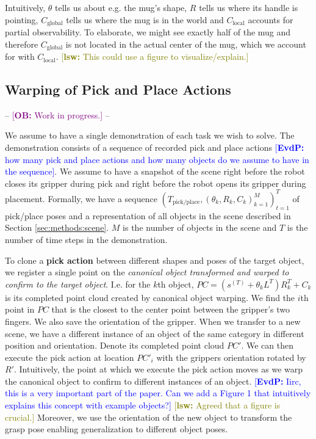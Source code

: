 \documentclass{article}
\newcommand{\ob}[1]{\textcolor{purple}{[\textbf{OB:} #1]}}
\newcommand{\evdp}[1]{\textcolor{blue}{[\textbf{EvdP:} #1]}}
\newcommand{\lsw}[1]{\textcolor{olive}{[\textbf{lsw:} #1]}}
\begin{document}
Intuitively, $\theta$ tells us about e.g. the mug's shape, $R$ tells us where its handle is pointing, $C_{\text{global}}$ tells us where the mug is in the world and $C_{\text{local}}$ accounts for partial observability. To elaborate, we might see exactly half of the mug and therefore $C_{\text{global}}$ is not located in the actual center of the mug, which we account for with $C_{\text{local}}$.
\lsw{This could use a figure to visualize/explain.}

\subsection{Warping of Pick and Place Actions}
\label{sec:methods:cloning}

-- \ob{Work in progress.} --

We assume to have a single demonstration of each task we wish to solve. The demonstration consists of a sequence of recorded pick and place actions \evdp{how many pick and place actions and how many objects do we assume to have in the sequence}. We assume to have a snapshot of the scene right before the robot closes its gripper during pick and right before the robot opens its gripper during placement. Formally, we have a sequence $\left(T_{\text{pick/place}}, (\theta_k, R_k, C_k)_{k=1}^M\right)_{t=1}^T$ of pick/place poses and a representation of all objects in the scene described in Section \ref{sec:methods:scene}. $M$ is the number of objects in the scene and $T$ is the number of time steps in the demonstration.

To clone a \textbf{pick action} between different shapes and poses of the target object, we register a single point on the \textit{canonical object transformed and warped to confirm to the target object}. I.e. for the $k$th object, $PC = (s^{(T)} + \theta_k L^T) R_k^T + C_k$ is its completed point cloud created by canonical object warping. We find the $i$th point in $PC$ that is the closest to the center point between the gripper's two fingers. We also save the orientation of the gripper. When we transfer to a new scene, we have a different instance of an object of the same category in different position and orientation. Denote its completed point cloud $PC'$. We can then execute the pick action at location $PC'_i$ with the grippers orientation rotated by $R'$. Intuitively, the point at which we execute the pick action moves as we warp the canonical object to confirm to different instances of an object. \evdp{Iirc, this is a very important part of the paper. Can we add a Figure 1 that intuitively explains this concept with example objects?}
\lsw{Agreed that a figure is crucial.}
Moreover, we use the orientation of the new object to transform the grasp pose enabling generalization to different object poses.
\end{document}
